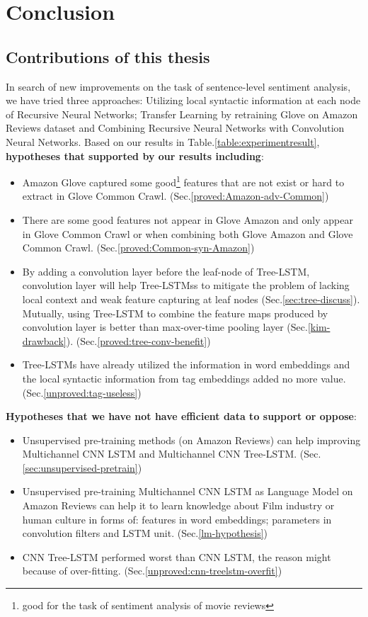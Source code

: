 \hypertarget{chap:conclude}{\chapter{Conclusion}}\label{conclusion}
\section{Contributions of this thesis}
In search of new improvements on the task of sentence-level sentiment analysis, we have tried three approaches: Utilizing local syntactic information at each node of Recursive Neural Networks; Transfer Learning by retraining Glove on Amazon Reviews dataset and Combining Recursive Neural Networks with Convolution Neural Networks.
Based on our results in Table.\ref{table:experimentresult}, \textbf{hypotheses that supported by our results including}:
\begin{itemize}
\item Amazon Glove captured some good\footnote{good for the task of sentiment analysis of movie reviews} features that are not exist or hard to extract in Glove Common Crawl. (Sec.\ref{proved:Amazon-adv-Common})

\item There are some good features not appear in Glove Amazon and only appear in Glove Common Crawl or when combining both Glove Amazon and Glove Common Crawl. (Sec.\ref{proved:Common-syn-Amazon})

\item By adding a convolution layer before the leaf-node of Tree-LSTM, convolution layer will help Tree-LSTMss to mitigate the problem of lacking local context and weak feature capturing at leaf nodes (Sec.\ref{sec:tree-discuss}).
Mutually, using Tree-LSTM to combine the feature maps produced by convolution layer is better than max-over-time pooling layer (Sec.\ref{kim-drawback}). (Sec.\ref{proved:tree-conv-benefit})

\item  Tree-LSTMs have already utilized the information in word embeddings and the local syntactic information from tag embeddings added no more value. (Sec.\ref{unproved:tag-useless})
\end{itemize}
\bigbreak
\label{unproved-hypo}
\textbf{Hypotheses that we have not have efficient data to support or oppose}:
\begin{itemize}
\item Unsupervised pre-training methods (on Amazon Reviews) can help improving Multichannel CNN LSTM and Multichannel CNN Tree-LSTM. (Sec.\ref{sec:unsupervised-pretrain})

\item  Unsupervised pre-training Multichannel CNN LSTM as Language Model on Amazon Reviews can help it to learn knowledge about Film industry or human culture in forms of: features in word embeddings; parameters in convolution filters and LSTM unit. (Sec.\ref{lm-hypothesis})

\item CNN Tree-LSTM performed worst than CNN LSTM, the reason might because of over-fitting. (Sec.\ref{unproved:cnn-treelstm-overfit})
\end{itemize}

